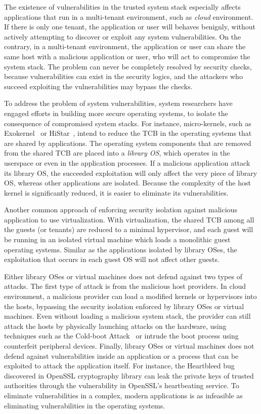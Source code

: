The existence of vulnerabilities in the trusted system stack especially affects applications that run in a multi-tenant environment, such as {\em cloud} environment.
If there is only one tenant,
the application or user will behaves benignly,
without actively attempting to discover or exploit any system vulnerabilities.
On the contrary, in a multi-tenant environment,
the application or user can share the same host with a malicious application or user,
who will act to compromise the system stack.
The problem can never be completely resolved by security checks,
because vulnerabilities can exist in the security logics,
and the attackers who succeed exploiting the vulnerabilities may bypass the checks.

To address the problem of system vulnerabilities, system researchers have engaged efforts in building more secure operating systems,
to isolate the consequence of compromised system stacks.
For instance,
micro-kernels, such as Exokernel~\citep{engler95exokernel} or HiStar~\citep{zeldovich+histar},
intend to reduce the TCB in the operating systems that are shared by applications.
The operating system components that are removed from the shared TCB are placed into a {\em library OS}, which operates in the userspace or even in the application processes.
If a malicious application attack its library OS,
the succeeded exploitation will only affect the very piece of library OS,
whereas other applications are isolated.
Because the complexity of the host kernel is significantly reduced,
it is easier to eliminate its vulnerabilities.

Another common approach of enforcing security isolation against malicious application to use virtualization.
With virtualization, the shared TCB among all the guests (or tenants)
are reduced to a minimal hypervisor,
and each guest will be running in an isolated virtual machine which loads a monolithic guest operating systems.
Similar as the applications isolated by library OSes, the exploitation that occurs in each guest OS will not affect other guests.

Either library OSes or virtual machines does not defend against two types of attacks.
The first type of attack is from the malicious host providers.
In cloud environment, a malicious provider can load a modified kernels or hypervisors into the hosts,
bypassing the security isolation enforced by library OSes or virtual machines.
Even without loading a malicious system stack,
the provider can still attack the hosts by physically launching attacks on the hardware, using techniques such as the Cold-boot Attack~\citep{halderman09coldboot} or 
intrude the boot process using counterfeit peripheral devices.
Finally, library OSes or virtual machines does not defend against vulnerabilities
inside an application or a process
that can be exploited to attack the application itself.
For instance, the Heartbleed bug~\citep{heartbleed} discovered in OpenSSL cryptography library
can leak the private keys of trusted authorities through the vulnerability in OpenSSL's heartbeating service.
To eliminate vulnerabilities in a complex, modern applications is as infeasible as eliminating vulnerabilities in the operating systems.

